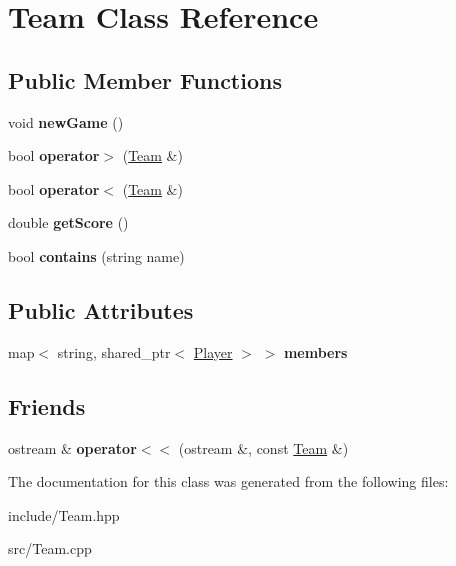 \hypertarget{classTeam}{\section{\-Team \-Class \-Reference}
\label{classTeam}
}
\subsection*{\-Public \-Member \-Functions}
\begin{DoxyCompactItemize}
\item 
\hypertarget{classTeam_af7fdc812a83e0e8c0bb24bc1c50b30ca}{void {\bfseries new\-Game} ()}\label{classTeam_af7fdc812a83e0e8c0bb24bc1c50b30ca}

\item 
\hypertarget{classTeam_a6e4f0ac4ea36e59179f85dd5b38e94af}{bool {\bfseries operator$>$} (\hyperlink{classTeam}{\-Team} \&)}\label{classTeam_a6e4f0ac4ea36e59179f85dd5b38e94af}

\item 
\hypertarget{classTeam_abaa1118ebd9ca60bba6d06cd646149a5}{bool {\bfseries operator$<$} (\hyperlink{classTeam}{\-Team} \&)}\label{classTeam_abaa1118ebd9ca60bba6d06cd646149a5}

\item 
\hypertarget{classTeam_a87c5336a6fb6b87b569e73031e78dfa4}{double {\bfseries get\-Score} ()}\label{classTeam_a87c5336a6fb6b87b569e73031e78dfa4}

\item 
\hypertarget{classTeam_ab0fe5bff14090bc5ab8ce90a81780412}{bool {\bfseries contains} (string name)}\label{classTeam_ab0fe5bff14090bc5ab8ce90a81780412}

\end{DoxyCompactItemize}
\subsection*{\-Public \-Attributes}
\begin{DoxyCompactItemize}
\item 
\hypertarget{classTeam_a5e2f0bd7b2f9885e7d99c0b1c612b5fa}{map$<$ string, shared\-\_\-ptr$<$ \hyperlink{classPlayer}{\-Player} $>$ $>$ {\bfseries members}}\label{classTeam_a5e2f0bd7b2f9885e7d99c0b1c612b5fa}

\end{DoxyCompactItemize}
\subsection*{\-Friends}
\begin{DoxyCompactItemize}
\item 
\hypertarget{classTeam_a6a20eb26a63a224b3970386af40bfb2b}{ostream \& {\bfseries operator$<$$<$} (ostream \&, const \hyperlink{classTeam}{\-Team} \&)}\label{classTeam_a6a20eb26a63a224b3970386af40bfb2b}

\end{DoxyCompactItemize}


\-The documentation for this class was generated from the following files\-:\begin{DoxyCompactItemize}
\item 
include/\-Team.\-hpp\item 
src/\-Team.\-cpp\end{DoxyCompactItemize}
